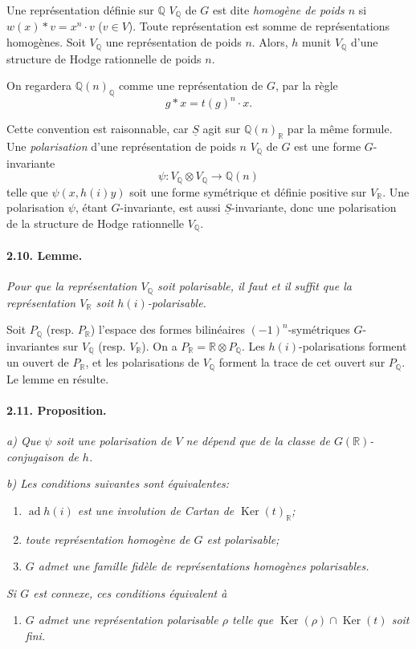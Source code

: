 \documentclass[10pt,leqno]{article}
\newcommand{\Q}{\mathbb{Q}}
\newcommand{\R}{\mathbb{R}}
\newcommand{\Ker}{\operatorname{Ker}}
\newcommand{\ad}{\operatorname{ad}}
\begin{document}
Une représentation définie sur $\Q$ $V_\Q$ de $G$ est dite \emph{homogène de poids $n$} si $w(x)*v=x^n\cdot v$ ($v\in V$). Toute représentation est somme de représentations homogènes. Soit $V_\Q$ une représentation de poids $n$. Alors, $h$ munit $V_\Q$ d'une structure de Hodge rationnelle de poids $n$.

On regardera $\Q(n)_\Q$ comme une représentation de $G$, par la règle
\[
g*x=t(g)^n\cdot x.
\]

\clearpage

Cette convention est raisonnable, car $\underline S$ agit sur $\Q(n)_\R$ par la même formule. Une \emph{polarisation} d'une représentation de poids $n$ $V_\Q$ de $G$ est une forme $G$-invariante
\[
\psi:V_\Q\otimes V_\Q\longrightarrow\Q(n)
\]
telle que $\psi(x,h(i)y)$ soit une forme symétrique et définie positive sur $V_\R$. Une polarisation $\psi$, étant $G$-invariante, est aussi $\underline S$-invariante, donc une polarisation de la structure de Hodge rationnelle $V_\Q$.

\paragraph{2.10. Lemme.} \emph{Pour que la représentation $V_\Q$ soit polarisable, il faut et il suffit que la représentation $V_\R$ soit $h(i)$-polarisable.}

Soit $P_\Q$ (resp. $P_\R$) l'espace des formes bilinéaires $(-1)^n$-symétriques $G$-invariantes sur $V_\Q$ (resp. $V_\R$). On a $P_\R=\R\otimes P_\Q$. Les $h(i)$-polarisations forment un ouvert de $P_\R$, et les polarisations de $V_\Q$ forment la trace de cet ouvert sur $P_\Q$. Le lemme en résulte.

\paragraph{2.11. Proposition.} \emph{a) Que $\psi$ soit une polarisation de $V$ ne dépend que de la classe de $G(\R)$-conjugaison de $h$.}

\emph{b) Les conditions suivantes sont équivalentes:}
\begin{enumerate}[label=(\roman*)]
\item \emph{$\ad h(i)$ est une involution de Cartan de $\Ker(t)_\R$;}
\item \emph{toute représentation homogène de $G$ est polarisable;}
\item \emph{$G$ admet une famille fidèle de représentations homogènes polarisables.}
\end{enumerate}
\emph{Si $G$ est connexe, ces conditions équivalent à}
\begin{enumerate}[label=(iii\textquotesingle)]
\item \emph{$G$ admet une représentation polarisable $\rho$ telle que $\Ker(\rho)\cap\Ker(t)$ soit fini.}
\end{enumerate}
\end{document}

